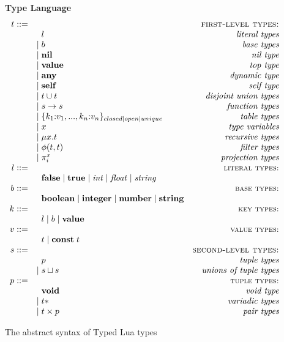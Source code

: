 \begin{figure}[!ht]
\textbf{Type Language}\\
\dstart
$$
\begin{array}{rlr}
t ::= & & \textsc{first-level types:}\\
& \;\; l & \textit{literal types}\\
& | \; b & \textit{base types}\\
& | \; \mathbf{nil} & \textit{nil type}\\
& | \; \mathbf{value} & \textit{top type}\\
& | \; \mathbf{any} & \textit{dynamic type}\\
& | \; \mathbf{self} & \textit{self type}\\
& | \; t \cup t & \textit{disjoint union types}\\
& | \; s \rightarrow s & \textit{function types}\\
& | \; \{k_{1}{:}v_{1}, ..., k_{n}{:}v_{n}\}_{closed|open|unique} & \textit{table types}\\
& | \; x & \textit{type variables}\\
& | \; \mu x.t & \textit{recursive types}\\
& | \; \phi(t,t) & \textit{filter types}\\
& | \; \pi_{i}^{x} & \textit{projection types}\\
l ::= & & \textsc{{\small literal types:}}\\
& \;\; \mathbf{false} \; | \; \mathbf{true} \; | \; {\it int} \; | \; {\it float} \; | \; {\it string} &\\
b ::= & & \textsc{{\small base types:}}\\
& \;\; \mathbf{boolean} \; | \; \mathbf{integer} \; | \; \mathbf{number} \; | \; \mathbf{string} &\\
k ::= & & \textsc{{\small key types:}}\\
& \;\; l \; | \; b \; | \; \mathbf{value} &\\
v ::= & & \textsc{{\small value types:}}\\
& \;\; t \; | \; \mathbf{const} \; t &\\ 
s ::= & & \textsc{second-level types:}\\
& \;\; p & \textit{tuple types}\\
& | \; s \sqcup s & \textit{unions of tuple types}\\
p ::= & & \textsc{{\small tuple types:}}\\
& \;\; \mathbf{void} & \textit{void type}\\
& | \; t* & \textit{variadic types}\\
& | \; t \times p & \textit{pair types}
\end{array}
$$
\dend
\caption{The abstract syntax of Typed Lua types}
\label{fig:typelang}
\end{figure}

